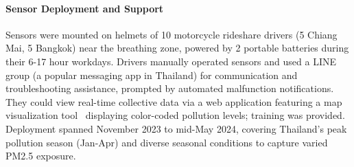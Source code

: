 

\paragraph{Sensor Deployment and Support}
Sensors were mounted on helmets of 10 motorcycle rideshare drivers (5 Chiang Mai, 5 Bangkok) near the breathing zone, powered by 2 portable batteries during their 6-17 hour workdays.
Drivers manually operated sensors and used a LINE group (a popular messaging app in Thailand) for communication and troubleshooting assistance, prompted by automated malfunction notifications.
They could view real-time collective data via a web application featuring a map visualization tool~\cite{mapvis} displaying color-coded pollution levels; training was provided.
Deployment spanned November 2023 to mid-May 2024, covering Thailand's peak pollution season (Jan-Apr) and diverse seasonal conditions to capture varied PM2.5 exposure.

